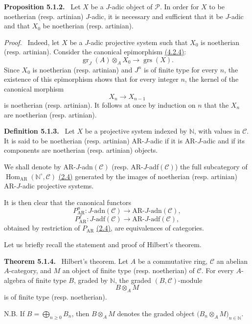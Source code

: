 \documentclass[11pt]{article}
\newenvironment{statement}[1]{\par\medskip\noindent\textbf{#1.}\ }{\par\medskip}
\newenvironment{prooftext}[1][Proof]{\par\noindent\emph{#1.}\ }{\par\medskip}
\DeclareMathOperator{\Hom}{Hom}
\providecommand{\gr}{\operatorname{gr}}
\providecommand{\Hom}{\operatorname{Hom}}
\providecommand{\gr}{\operatorname{gr}}
\providecommand{\gr}{\operatorname{gr}}
\providecommand{\grs}{\operatorname{grs}}
\providecommand{\Hom}{\operatorname{Hom}}
\begin{document}
\label{sga5:V:proposition:5.1.2}\begin{statement}{Proposition 5.1.2}
Let \(X\) be a \(J\)-adic object of \(\mathcal P\). In order for \(X\) to be noetherian (resp. artinian) \(J\)-adic, it is necessary and sufficient that it be \(J\)-adic and that \(X_0\) be noetherian (resp. artinian).
\end{statement}

\begin{prooftext}
Indeed, let \(X\) be a \(J\)-adic projective system such that \(X_0\) is noetherian (resp. artinian). Consider the canonical epimorphism \hyperref[sga5:V:lemma:4.2.4]{(4.2.4)}:
\[
\gr_J(A)\otimes_A X_0\longrightarrow \grs(X).
\]
Since \(X_0\) is noetherian (resp. artinian) and \(J^n\) is of finite type for every \(n\), the existence of this epimorphism shows that for every integer \(n\), the kernel of the canonical morphism
\[
X_n\longrightarrow X_{n-1}
\]
is noetherian (resp. artinian). It follows at once by induction on \(n\) that the \(X_n\) are noetherian (resp. artinian).
\end{prooftext}

\label{sga5:V:definition:5.1.3}\begin{statement}{Definition 5.1.3}
Let \(X\) be a projective system indexed by \(\mathbb N\), with values in \(\mathcal C\). It is said to be noetherian (resp. artinian) AR-\(J\)-adic if it is AR-\(J\)-adic and if its components are noetherian (resp. artinian) objects.
\end{statement}

We shall denote by AR-\(J\)-adn\((\mathcal C)\) (resp. AR-\(J\)-adf\((\mathcal C)\)) the full subcategory of \(\Hom_{\mathrm{AR}}(\mathbb N^\circ,\mathcal C)\) \hyperref[sga5:V:subsubsection:2.4]{(2.4)} generated by the images of noetherian (resp. artinian) AR-\(J\)-adic projective systems.

It is then clear that the canonical functors
\[
P^n_{\mathrm{AR}}:J\text{-adn}(\mathcal C)\longrightarrow \mathrm{AR}\text{-}J\text{-adn}(\mathcal C),
\]
\[
P^f_{\mathrm{AR}}:J\text{-adf}(\mathcal C)\longrightarrow \mathrm{AR}\text{-}J\text{-adf}(\mathcal C),
\]
obtained by restriction of \(P_{\mathrm{AR}}\) \hyperref[sga5:V:subsubsection:2.4]{(2.4)}, are equivalences of categories.

Let us briefly recall the statement and proof of Hilbert's theorem.

\label{sga5:V:theorem:5.1.4}\begin{statement}{Theorem 5.1.4}
Hilbert's theorem. Let \(A\) be a commutative ring, \(\mathcal C\) an abelian \(A\)-category, and \(M\) an object of finite type (resp. noetherian) of \(\mathcal C\). For every \(A\)-algebra of finite type \(B\), graded by \(\mathbb N\), the graded \((B,\mathcal C)\)-module
\[
B\otimes_A M
\]
is of finite type (resp. noetherian).

N.B. If \(B=\bigoplus_{n\ge0}B_n\), then \(B\otimes_A M\) denotes the graded object \(\bigl(B_n\otimes_A M\bigr)_{n\in\mathbb N}\).
\end{statement}
\end{document}
